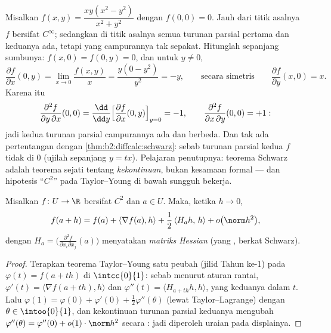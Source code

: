 \begin{example}\label{ex:b2:diffcalc:peano}
Misalkan $f(x, y) = \dfrac{xy(x^2 - y^2)}{x^2 + y^2}$ dengan $f(0,0) = 0$.
Jauh dari titik asalnya $f$ bersifat $C^\infty$; sedangkan di titik asalnya semua turunan
parsial pertama dan keduanya ada, tetapi yang campurannya tak sepakat. Hitunglah
sepanjang sumbunya: $f(x, 0) = f(0, y) = 0$, dan untuk $y \neq 0$,
\[
\frac{\partial f}{\partial x}(0, y)
= \lim_{x\to0}\frac{f(x,y)}{x}
= \frac{y(0 - y^2)}{y^2} = -y ,
\qquad\text{secara simetris}\qquad
\frac{\partial f}{\partial y}(x, 0) = x .
\]
Karena itu
\[
\frac{\partial^2 f}{\partial y\,\partial x}(0,0)
= \frac{\dd}{\dd y}\Bigl[\frac{\partial f}{\partial
x}(0,y)\Bigr]_{y=0} = -1,
\qquad
\frac{\partial^2 f}{\partial x\,\partial y}(0,0) = +1 :
\]
jadi kedua turunan parsial campurannya ada dan berbeda. Dan tak ada pertentangan dengan
\cref{thm:b2:diffcalc:schwarz}: sebab turunan parsial kedua $f$
tidak  di $0$ (ujilah sepanjang $y = tx$). Pelajaran penutupnya:
teorema Schwarz adalah teorema sejati tentang \emph{kekontinuan},
bukan kesamaan formal --- dan hipotesis ``$C^2$'' pada
Taylor--Young di bawah sungguh bekerja.
\end{example}

\begin{theorem}\label{thm:b2:diffcalc:taylor}
Misalkan $f \colon U \to \R$ bersifat $C^2$ dan $a \in U$. Maka, ketika $h \to 0$,
\[
f(a + h) = f(a) + \langle\nabla f(a), h\rangle
+ \frac12\, \langle H_a h,\, h\rangle + o\bigl(\norm h^2\bigr),
\]
dengan $H_a = \bigl(\frac{\partial^2 f}{\partial x_i\partial
x_j}(a)\bigr)$ menyatakan \emph{matriks Hessian}
(yang , berkat Schwarz).
\end{theorem}

\begin{proof}
Terapkan teorema Taylor--Young satu peubah (jilid Tahun ke-1) pada
$\varphi(t) = f(a + th)$ di $\intcc{0}{1}$: sebab menurut aturan rantai,
$\varphi'(t) = \langle \nabla f(a + th), h\rangle$ dan $\varphi''(t)
= \langle H_{a+th}h, h\rangle$, yang keduanya  dalam $t$. Lalu
$\varphi(1) = \varphi(0) + \varphi'(0) + \frac12\varphi''(\theta)$
(lewat Taylor--Lagrange) dengan $\theta \in \intoo{0}{1}$, dan kekontinuan
turunan parsial keduanya mengubah $\varphi''(\theta) =
\varphi''(0) + o(1)\cdot\norm h^2$ secara : jadi diperoleh
uraian pada displainya.
\end{proof}

